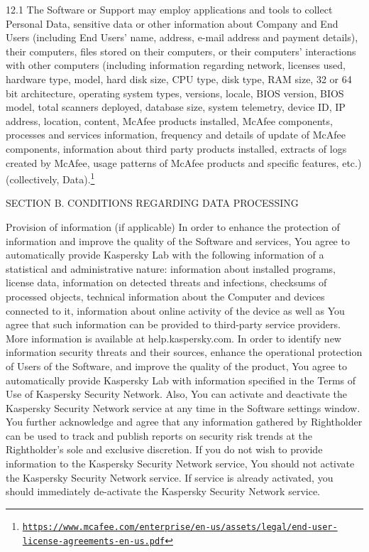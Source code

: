\begin{tcolorbox}
  \small
  12.1 The Software or Support may employ applications and tools to collect
  Personal Data, sensitive data or other information about Company and End
  Users (including End Users’ name, address, e-mail address and payment
  details), their computers, files stored on their computers, or their
  computers’ interactions with other computers (including information
  regarding network, licenses used, hardware type, model, hard disk size, CPU
  type, disk type, RAM size, 32 or 64 bit architecture, operating system
  types, versions, locale, BIOS version, BIOS model, total scanners deployed,
  database size, system telemetry, device ID, IP address, location, content,
  McAfee products installed, McAfee components, processes and services
  information, frequency and details of update of McAfee components,
  information about third party products installed, extracts of logs created
  by McAfee, usage patterns of McAfee products and specific features, etc.)
  (collectively,
  Data).\footnote{\href{https://www.mcafee.com/enterprise/en-us/assets/legal/end-user-license-agreements-en-us.pdf}{\texttt{https://www.mcafee.com/enterprise/en-us/assets/legal/end-user-license-agreements-en-us.pdf}}}
  
  \tcblower
  SECTION B. CONDITIONS REGARDING DATA PROCESSING

  Provision of information (if applicable) In order to enhance the protection
  of information and improve the quality of the Software and services, You
  agree to automatically provide Kaspersky Lab with the following information
  of a statistical and administrative nature: information about installed
  programs, license data, information on detected threats and infections,
  checksums of processed objects, technical information about the Computer and
  devices connected to it, information about online activity of the device as
  well as You agree that such information can be provided to third-party
  service providers. More information is available at help.kaspersky.com.  In
  order to identify new information security threats and their sources,
  enhance the operational protection of Users of the Software, and improve the
  quality of the product, You agree to automatically provide Kaspersky Lab
  with information specified in the Terms of Use of Kaspersky Security
  Network.  Also, You can activate and deactivate the Kaspersky Security
  Network service at any time in the Software settings window.  You further
  acknowledge and agree that any information gathered by Rightholder can be
  used to track and publish reports on security risk trends at the
  Rightholder’s sole and exclusive discretion.  If you do not wish to provide
  information to the Kaspersky Security Network service, You should not
  activate the Kaspersky Security Network service. If service is already
  activated, you should immediately de-activate the Kaspersky Security Network
  service.


\end{tcolorbox}
